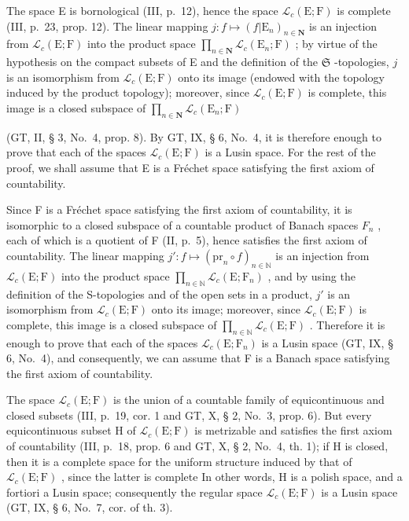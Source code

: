 The space E is bornological (III, p.~12), hence the space \(\mathcal{L}_c(\mathrm{E};\mathrm{F})\) is complete (III, p.~23, prop. 12). The linear mapping \(j\colon f\mapsto (f|\mathrm{E}_n)_{n\in \mathbf{N}}\) is an injection from \(\mathcal{L}_c(\mathrm{E};\mathrm{F})\) into the product space \(\prod_{n\in \mathbf{N}}\mathcal{L}_c(\mathrm{E}_n;\mathrm{F})\) ; by virtue of the hypothesis on the compact subsets of E and the definition of the \(\mathfrak{S}\) -topologies, \(j\) is an isomorphism from \(\mathcal{L}_c(\mathrm{E};\mathrm{F})\) onto its image (endowed with the topology induced by the product topology); moreover, since \(\mathcal{L}_c(\mathrm{E};\mathrm{F})\) is complete, this image is a closed subspace of \(\prod_{n\in \mathbf{N}}\mathcal{L}_c(\mathrm{E}_n;\mathrm{F})\)

(GT, II, § 3, No.~4, prop. 8). By GT, IX, § 6, No.~4, it is therefore enough to prove that each of the spaces \(\mathcal{L}_c(\mathrm{E};\mathrm{F})\) is a Lusin space. For the rest of the proof, we shall assume that E is a Fréchet space satisfying the first axiom of countability.

Since F is a Fréchet space satisfying the first axiom of countability, it is isomorphic to a closed subspace of a countable product of Banach spaces \(F_{n}\) , each of which is a quotient of F (II, p.~5), hence satisfies the first axiom of countability. The linear mapping \(j': f \mapsto (\mathrm{pr}_{n} \circ f)_{n \in \mathbb{N}}\) is an injection from \(\mathcal{L}_{c}(\mathrm{E}; \mathrm{F})\) into the product space \(\prod_{n \in \mathbb{N}} \mathcal{L}_{c}(\mathrm{E}; \mathrm{F}_{n})\) , and by using the definition of the S-topologies and of the open sets in a product, \(j'\) is an isomorphism from \(\mathcal{L}_{c}(\mathrm{E}; \mathrm{F})\) onto its image; moreover, since \(\mathcal{L}_{c}(\mathrm{E}; \mathrm{F})\) is complete, this image is a closed subspace of \(\prod_{n \in \mathbb{N}} \mathcal{L}_{c}(\mathrm{E}; \mathrm{F})\) . Therefore it is enough to prove that each of the spaces \(\mathcal{L}_{c}(\mathrm{E}; \mathrm{F}_{n})\) is a Lusin space (GT, IX, § 6, No.~4), and consequently, we can assume that F is a Banach space satisfying the first axiom of countability.

The space \(\mathcal{L}_{c}(\mathrm{E};\mathrm{F})\) is the union of a countable family of equicontinuous and closed subsets (III, p.~19, cor. 1 and GT, X, § 2, No.~3, prop. 6). But every equicontinuous subset H of \(\mathcal{L}_{c}(\mathrm{E};\mathrm{F})\) is metrizable and satisfies the first axiom of countability (III, p.~18, prop. 6 and GT, X, § 2, No.~4, th. 1); if H is closed, then it is a complete space for the uniform structure induced by that of \(\mathcal{L}_{c}(\mathrm{E};\mathrm{F})\) , since the latter is complete In other words, H is a polish space, and a fortiori a Lusin space; consequently the regular space \(\mathcal{L}_{c}(\mathrm{E};\mathrm{F})\) is a Lusin space (GT, IX, § 6, No.~7, cor. of th. 3).

